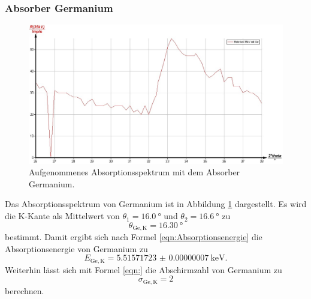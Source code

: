 \subsubsection{Absorber Germanium}
\begin{figure}
	\includegraphics[width=1.0\textwidth]{nIKO_und_jULIAN_ÜLADS/germanium.jpg}
	\caption{Aufgenommenes Absorptionsspektrum mit dem Absorber Germanium.}
	\label{fig:germanium_absorber}
\end{figure}
Das Absorptionsspektrum von Germanium ist in Abbildung \ref{fig:germanium_absorber}
dargestellt. Es wird die K-Kante als Mittelwert von $\theta_1 = \SI{16,0}{\degree}$ und
$\theta_2 = \SI{16,6}{\degree}$ zu
\begin{equation*}
	\theta_{\mathrm{Ge,K}} = \SI{16,30}{\degree}
\end{equation*}
bestimmt. Damit ergibt sich nach Formel \eqref{eqn:Absorptionsenergie} die Absorptionsenergie
von Germanium zu
\begin{equation*}
	E_{\mathrm{Ge,K}} = \SI{5.51571723(7)}{\kilo\electronvolt} \mathrm{.}
\end{equation*}
Weiterhin lässt sich mit Formel \eqref{eqn:} die Abschirmzahl von Germanium zu
\begin{equation*}
	\sigma_{\mathrm{Ge,K}} = 2
\end{equation*}
berechnen.

\FloatBarrier
